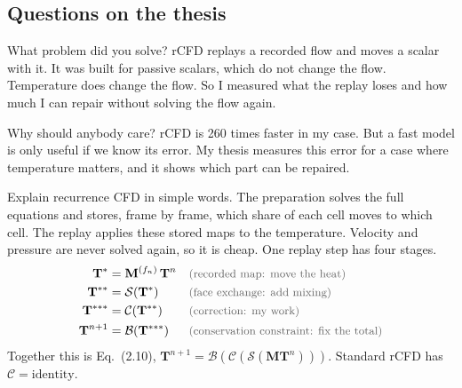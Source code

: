 \subsection{Questions on the thesis}

\begin{qabox}{What problem did you solve?}
\explain rCFD replays a recorded flow and moves a scalar with it. It was built for passive scalars,
which do not change the flow. Temperature does change the flow. So I measured what the replay loses
and how much I can repair without solving the flow again.
\end{qabox}

\begin{qabox}{Why should anybody care?}
\explain rCFD is 260 times faster in my case. But a fast model is only useful if we know its error.
My thesis measures this error for a case where temperature matters, and it shows which part can be
repaired.
\end{qabox}

\begin{qabox}{Explain recurrence CFD in simple words.}
\explain The preparation solves the full equations and stores, frame by frame, which share of each
cell moves to which cell. The replay applies these stored maps to the temperature. Velocity and
pressure are never solved again, so it is cheap. One replay step has four stages.
\derive
\begin{align*}
\mathbf{T}^{*} &= \mathbf{M}^{(f_n)}\,\mathbf{T}^{n} \why{recorded map: move the heat} \\
\mathbf{T}^{**} &= \mathcal{S}(\mathbf{T}^{*}) \why{face exchange: add mixing} \\
\mathbf{T}^{***} &= \mathcal{C}(\mathbf{T}^{**}) \why{correction: my work} \\
\mathbf{T}^{n+1} &= \mathcal{B}(\mathbf{T}^{***}) \why{conservation constraint: fix the total}
\end{align*}
Together this is Eq.~(2.10), $\mathbf{T}^{n+1} = \mathcal{B}(\mathcal{C}(\mathcal{S}(\mathbf{M}\mathbf{T}^n)))$.
Standard rCFD has $\mathcal{C} = \text{identity}$.
\end{qabox}

